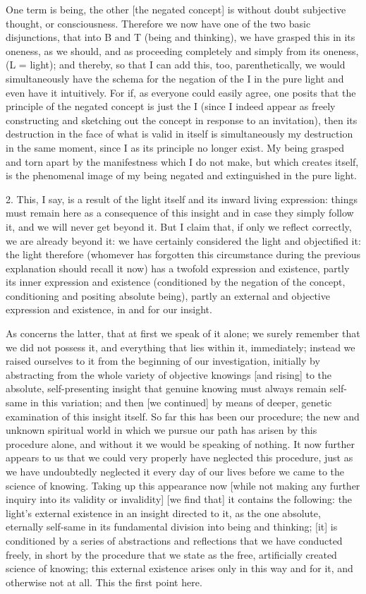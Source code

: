 One term is being, the other [the negated concept] is
without doubt subjective thought, or consciousness.
Therefore we now have one of the two basic disjunctions,
that into B and T (being and thinking),
we have grasped this in its oneness, as we should,
and as proceeding completely and simply
from its oneness, (L = light);
and thereby, so that I can add this, too, parenthetically,
we would simultaneously have the schema for the negation
of the I in the pure light and even have it intuitively.
For if, as everyone could easily agree, one posits
that the principle of the negated concept is just the I
(since I indeed appear as freely constructing and sketching out
the concept in response to an invitation),
then its destruction in the face of what is valid in itself is
simultaneously my destruction in the same moment,
since I as its principle no longer exist.
My being grasped and torn apart by the manifestness
which I do not make, but which creates itself, is
the phenomenal image of my being negated and extinguished
in the pure light.

2.  This, I say, is a result of the light itself
and its inward living expression:
things must remain here as a consequence of
this insight and in case they simply follow it,
and we will never get beyond it.
But I claim that, if only we reflect correctly,
we are already beyond it:
we have certainly considered the light
and objectified it: the light therefore
(whomever has forgotten this circumstance
during the previous explanation should recall it now)
has a twofold expression and existence,
partly its inner expression and existence
(conditioned by the negation of the concept,
conditioning and positing absolute being),
partly an external and objective expression and existence,
in and for our insight.

As concerns the latter, that at first we speak of it alone;
we surely remember that we did not possess it,
and everything that lies within it, immediately;
instead we raised ourselves to it from
the beginning of our investigation,
initially by abstracting from the whole variety
of objective knowings [and rising] to
the absolute, self-presenting insight
that genuine knowing must always remain self-same in this variation;
and then [we continued] by means of
deeper, genetic examination of this insight itself.
So far this has been our procedure;
the new and unknown spiritual world
in which we pursue our path has arisen
by this procedure alone,
and without it we would be speaking of nothing.
It now further appears to us that
we could very properly have neglected this procedure,
just as we have undoubtedly neglected it every day
of our lives before we came to the science of knowing.
Taking up this appearance now
[while not making any further inquiry
into its validity or invalidity]
[we find that] it contains the following:
the light's external existence in an insight directed to it,
as the one absolute, eternally self-same
in its fundamental division into being and thinking;
[it] is conditioned by a series of abstractions and reflections
that we have conducted freely,
in short by the procedure that we state as
the free, artificially created science of knowing;
this external existence arises only in this way and for it,
and otherwise not at all.
This the first point here.


